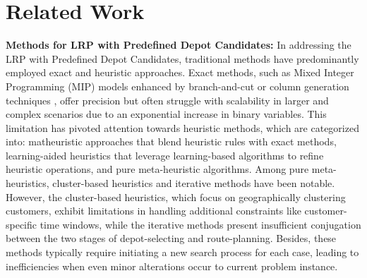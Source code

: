\section{Related Work}
\textbf{Methods for LRP with Predefined Depot Candidates:}
In addressing the LRP with Predefined Depot Candidates, traditional methods have predominantly employed exact and heuristic approaches. 
Exact methods, such as Mixed Integer Programming (MIP) models enhanced by branch-and-cut \cite{belenguer2011branch, akca2009branch} or column generation techniques \cite{contardo2014exact}, 
offer precision but often struggle with scalability in larger and complex scenarios due to an exponential increase in binary variables. 
This limitation has pivoted attention towards heuristic methods, which are categorized into: matheuristic approaches \cite{rath2014math, danach2019capacitated, ghasemi2022multi} that blend heuristic rules with exact methods, learning-aided heuristics \cite{prins2006solving, nguyen2012solving} that leverage learning-based algorithms to refine heuristic operations, and pure meta-heuristic algorithms. 
Among pure meta-heuristics, cluster-based heuristics \cite{billionnet2005designing, barreto2007using} and iterative methods \cite{salhi2009local, pourghader2022multi, albareda2007heuristic} have been notable.
However, the cluster-based heuristics, which focus on geographically clustering customers, exhibit limitations in handling additional constraints like customer-specific time windows, 
while the iterative methods present insufficient conjugation between the two stages of depot-selecting and route-planning.
Besides, these methods typically require initiating a new search process for each case, leading to inefficiencies when even minor alterations occur to current problem instance.



